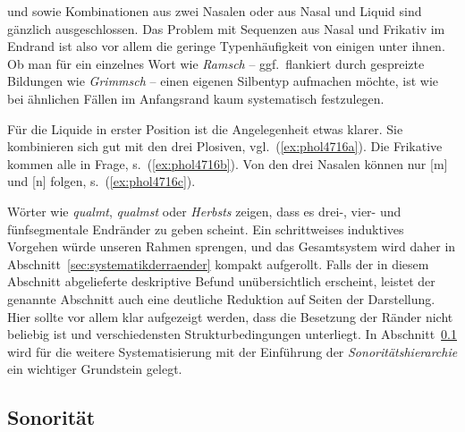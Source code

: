 \textipa{[mf]} und \textipa{[Nf]} sowie Kombinationen aus zwei Nasalen oder aus Nasal und Liquid sind gänzlich ausgeschlossen.
Das Problem mit Sequenzen aus Nasal und Frikativ im Endrand ist also vor allem die geringe Typenhäufigkeit von einigen unter ihnen.
Ob man \zB für ein einzelnes Wort wie \textit{Ramsch} -- ggf.\ flankiert durch gespreizte Bildungen wie \textit{Grimmsch} -- einen eigenen Silbentyp aufmachen möchte, ist wie bei ähnlichen Fällen im Anfangsrand kaum systematisch festzulegen.

Für die Liquide in erster Position ist die Angelegenheit etwas klarer.
Sie kombinieren sich gut mit den drei Plosiven, vgl.\ (\ref{ex:phol4716a}).
Die Frikative kommen alle in Frage, s.\ (\ref{ex:phol4716b}).
Von den drei Nasalen können nur [m] und [n] folgen, s.\ (\ref{ex:phol4716c}).

\begin{exe}
  \ex\label{ex:phol4716}
  \begin{xlist}
  \end{xlist}
\end{exe}

Wörter wie \textit{qualmt}, \textit{qualmst} oder \textit{Herbsts} zeigen, dass es drei-, vier- und fünfsegmentale Endränder zu geben scheint.
Ein schrittweises induktives Vorgehen würde unseren Rahmen sprengen, und das Gesamtsystem wird daher in Abschnitt~\ref{sec:systematikderraender} kompakt aufgerollt.
Falls der in diesem Abschnitt abgelieferte deskriptive Befund unübersichtlich erscheint, leistet der genannte Abschnitt auch eine deutliche Reduktion auf Seiten der Darstellung.
Hier sollte vor allem klar aufgezeigt werden, dass die Besetzung der Ränder nicht beliebig ist und verschiedensten Strukturbedingungen unterliegt.
In Abschnitt~\ref{sec:sonoritaet} wird für die weitere Systematisierung mit der Einführung der \textit{Sonoritätshierarchie} ein wichtiger Grundstein gelegt.


\subsection{Sonorität}

\label{sec:sonoritaet}

